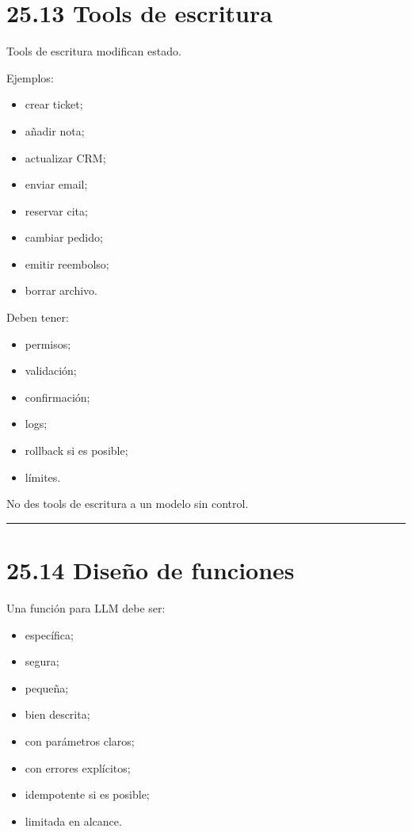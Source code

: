 \section{25.13 Tools de escritura}\label{tools-de-escritura}

Tools de escritura modifican estado.

Ejemplos:

\begin{itemize}
\tightlist
\item
  crear ticket;
\item
  añadir nota;
\item
  actualizar CRM;
\item
  enviar email;
\item
  reservar cita;
\item
  cambiar pedido;
\item
  emitir reembolso;
\item
  borrar archivo.
\end{itemize}

Deben tener:

\begin{itemize}
\tightlist
\item
  permisos;
\item
  validación;
\item
  confirmación;
\item
  logs;
\item
  rollback si es posible;
\item
  límites.
\end{itemize}

No des tools de escritura a un modelo sin control.

\begin{center}\rule{0.5\linewidth}{0.5pt}\end{center}

\section{25.14 Diseño de funciones}\label{diseuxf1o-de-funciones}

Una función para LLM debe ser:

\begin{itemize}
\tightlist
\item
  específica;
\item
  segura;
\item
  pequeña;
\item
  bien descrita;
\item
  con parámetros claros;
\item
  con errores explícitos;
\item
  idempotente si es posible;
\item
  limitada en alcance.
\end{itemize}

